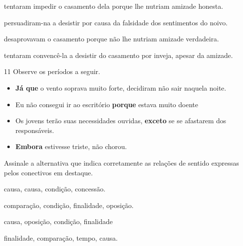 \begin{escolha}

    \item tentaram impedir o casamento dela porque lhe nutriam amizade honesta.

    \item persuadiram-na a desistir por causa da falsidade dos sentimentos do noivo.  

    \item desaprovavam o casamento porque não lhe nutriam amizade verdadeira.

    \item tentaram convencê-la a desistir do casamento por inveja, apesar da amizade.

\end{escolha}

\num{11} Observe os períodos a seguir.

\begin{itemize}

    \item \textbf{Já que} o vento soprava muito forte, decidiram não sair
naquela noite.

    \item Eu não consegui ir ao escritório \textbf{porque} estava muito doente

    \item Os jovens terão suas necessidades ouvidas, \textbf{exceto} se se
afastarem dos responsáveis.

    \item \textbf{Embora} estivesse triste, não chorou.

\end{itemize}

Assinale a alternativa que indica corretamente as relações de sentido
expressas pelos conectivos em destaque.

\begin{escolha}

    \item causa, causa, condição, concessão.

    \item comparação, condição, finalidade, oposição.

    \item causa, oposição, condição, finalidade

    \item finalidade, comparação, tempo, causa.

\end{escolha}

